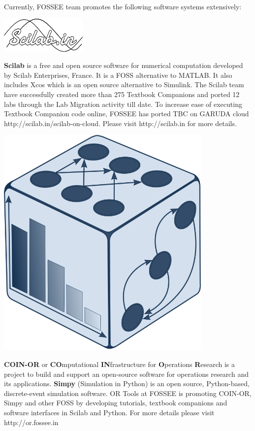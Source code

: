 \documentclass{letter}
\begin{document}
\newpage 
Currently, FOSSEE team promotes the following software systems
extensively: \\

\begin{minipage}[t]{0.48\linewidth} \begin{center}
\includegraphics[width=0.7\linewidth]{images/scilab_logo.png} \end{center}
\textbf{Scilab} is a free and open source software for numerical computation
developed by Scilab Enterprises, France. It is a FOSS alternative to MATLAB.
It also includes Xcos which is an open source alternative to Simulink. The
Scilab team have successfully created more than 275 Textbook Companions and
ported 12 labs through the Lab Migration activity till date. To increase ease
of executing Textbook Companion code online, FOSSEE has ported TBC on GARUDA
cloud {\color{blue}http://scilab.in/scilab-on-cloud}. Please visit {\color{blue}http://scilab.in} for
more details.  \end{minipage} \hspace{0.04\linewidth}
\begin{minipage}[t]{0.48\linewidth} \begin{center}
\includegraphics[width=0.25\linewidth]{images/coin_logo.png} \end{center}
\textbf{COIN-OR} or \textbf{CO}mputational \textbf{IN}frastructure for
\textbf{O}perations \textbf{R}esearch is a project to build and support an
open-source software for operations research and its applications.
\textbf{Simpy} (Simulation in Python) is an open source, Python-based,
discrete-event simulation software. OR Tools at FOSSEE is promoting COIN-OR,
Simpy and other FOSS by developing tutorials, textbook companions and software
interfaces in Scilab and Python. For more details please visit
{\color{blue}http://or.fossee.in} \end{minipage}
\end{document}
